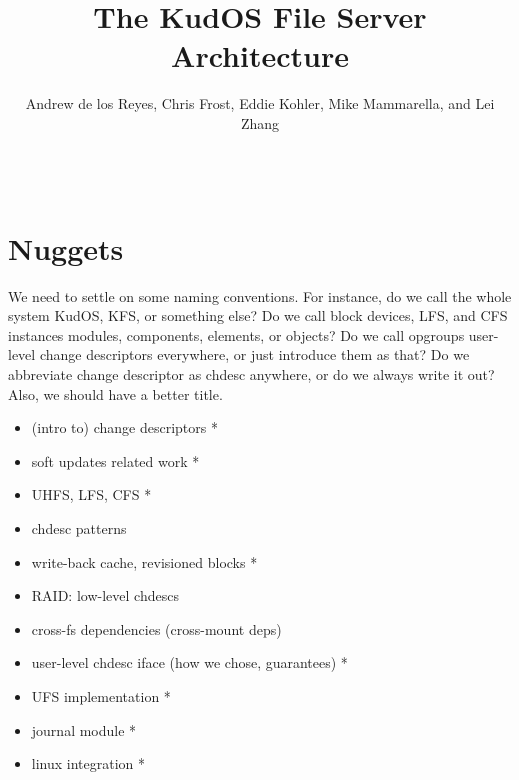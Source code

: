 \documentclass[10pt,twocolumn,letterpaper]{article}
\begin{document}
\normalsize

\title{\sffamily\textbf{The KudOS File Server Architecture}}


\author{\sffamily Andrew de los Reyes, Chris Frost, Eddie Kohler, Mike
Mammarella, and Lei Zhang \\
\noalign{\vskip2pt}
 \\
\noalign{\vskip2pt}
 \\
\noalign{\vskip-.25in}
\null}
\date{}
\maketitle

\def\assast{\raise.2ex\hbox{$^\ast$}}



\section{Nuggets}

We need to settle on some naming conventions. For instance, do we call the whole
system KudOS, KFS, or something else? Do we call block devices, LFS, and CFS
instances modules, components, elements, or objects? Do we call opgroups
user-level change descriptors everywhere, or just introduce them as that? Do we
abbreviate change descriptor as chdesc anywhere, or do we always write it out?
Also, we should have a better title.

\begin{itemize}
\item (intro to) change descriptors *
\item soft updates related work *
\item UHFS, LFS, CFS *
\item chdesc patterns
\item write-back cache, revisioned blocks *
\item RAID: low-level chdescs
\item cross-fs dependencies (cross-mount deps)
\item user-level chdesc iface (how we chose, guarantees) *
\item UFS implementation *
\item journal module *
\item linux integration *
\end{itemize}













\end{document}
